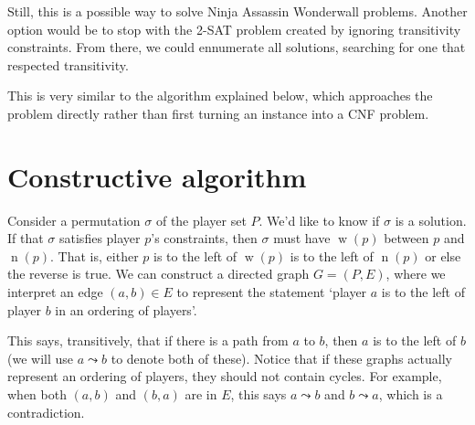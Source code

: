 \documentclass[12pt]{article}
\DeclareMathOperator{\w}{w}
\DeclareMathOperator{\n}{n}
\begin{document}
    Still, this is a possible way to solve Ninja Assassin Wonderwall problems. Another option would be to stop with the 2-SAT problem created by ignoring transitivity constraints. From there, we could ennumerate all solutions, searching for one that respected transitivity. %

    This is very similar to the algorithm explained below, which approaches the problem directly rather than first turning an instance into a CNF problem.

\section{Constructive algorithm}
    \label{sec:algorithm}
    Consider a permutation $\sigma$ of the player set $P$. We'd like to know if $\sigma$ is a solution. If that $\sigma$ satisfies player $p$'s constraints, then $\sigma$ must have $\w(p)$ between $p$ and $\n(p)$. That is, either $p$ is to the left of $\w(p)$ is to the left of $\n(p)$ or else the reverse is true. We can construct a directed graph $G=(P,E)$, where we interpret an edge $(a,b) \in E$ to represent the statement `player $a$ is to the left of player $b$ in an ordering of players'. 

    This says, transitively, that if there is a path from $a$ to $b$, then $a$ is to the left of $b$ (we will use $a \leadsto b$ to denote both of these). Notice that if these graphs actually represent an ordering of players, they should not contain cycles. For example, when both $(a,b)$ and $(b,a)$ are in $E$, this says $a \leadsto b$ and $b \leadsto a$, which is a contradiction. 
\end{document}
